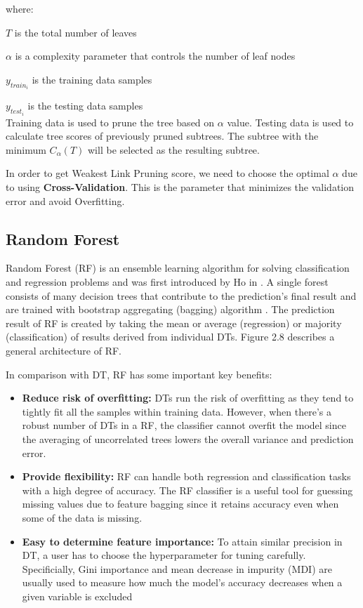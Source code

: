 \documentclass[a4paper, 12pt]{report}
\begin{document}
where:

$T$ is the total number of leaves

$\alpha$ is a complexity parameter that controls the number of leaf nodes

$y_{train_i}$ is the training data samples

$y_{test_i}$ is the testing data samples\\

Training data is used to prune the tree based on $\alpha$ value. Testing data is used to calculate tree scores of previously pruned subtrees. The subtree with the minimum $C_\alpha(T)$ will be selected as the resulting subtree.

In order to get Weakest Link Pruning score, we need to choose the optimal $\alpha$ due to using \textbf{Cross-Validation}. This is the parameter that minimizes the validation error and avoid Overfitting.

\subsection{Random Forest}
Random Forest (RF) is an ensemble learning algorithm for solving classification and
regression problems and was first introduced by Ho in \cite{aHo}. A single forest consists of many decision trees that contribute to the prediction’s final result and are trained with bootstrap aggregating (bagging) algorithm \cite{breiman}. The prediction result of RF is created by taking the mean or average (regression) or majority (classification) of results derived from individual DTs. Figure 2.8 describes a general architecture of RF. 

In comparison with DT, RF has some important key benefits\autocite{cRF}:
\begin{itemize}
\item \textbf{Reduce risk of overfitting:} DTs run the risk of overfitting as they tend to tightly fit all the samples within training data. However, when there’s a robust number of DTs in a RF, the classifier cannot overfit the model since the averaging of uncorrelated trees lowers the overall variance and prediction error.
\item \textbf{Provide flexibility:} RF can handle both regression and classification tasks with a high degree of accuracy. The RF classifier is a useful tool for guessing missing values due to feature bagging since it retains accuracy even when some of the data is missing.
\item \textbf{Easy to determine feature importance:} To attain similar precision in DT, a user has to choose the hyperparameter for tuning carefully. Specificially, Gini importance and mean decrease in impurity (MDI) are usually used to measure how much the model’s accuracy decreases when a given variable is excluded
\end{itemize}
\end{document}
